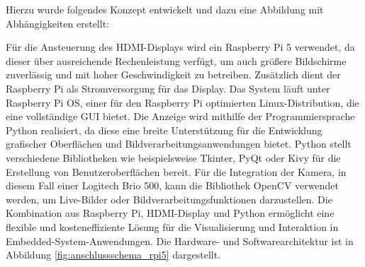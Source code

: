 Hierzu wurde folgendes Konzept entwickelt und dazu eine Abbildung mit Abhängigkeiten erstellt:


Für die Ansteuerung des HDMI-Displays wird ein Raspberry Pi 5 verwendet, da dieser über ausreichende Rechenleistung verfügt, um auch größere Bildschirme zuverlässig und mit hoher Geschwindigkeit zu betreiben. Zusätzlich dient der Raspberry Pi als Stromversorgung für das Display. Das System läuft unter Raspberry Pi OS, einer für den Raspberry Pi optimierten Linux-Distribution, die eine vollständige GUI bietet. Die Anzeige wird mithilfe der Programmiersprache Python realisiert, da diese eine breite Unterstützung für die Entwicklung grafischer Oberflächen und Bildverarbeitungsanwendungen bietet. Python stellt verschiedene Bibliotheken wie beispielsweise Tkinter, PyQt oder Kivy für die Erstellung von Benutzeroberflächen bereit. Für die Integration der Kamera, in diesem Fall einer Logitech Brio 500, kann die Bibliothek OpenCV verwendet werden, um Live-Bilder oder Bildverarbeitungsfunktionen darzustellen. Die Kombination aus Raspberry Pi, HDMI-Display und Python ermöglicht eine flexible und kosteneffiziente Lösung für die Visualisierung und Interaktion in Embedded-System-Anwendungen. Die Hardware- und Softwarearchitektur ist in Abbildung \ref{fig:anschlussschema_rpi5} dargestellt.
